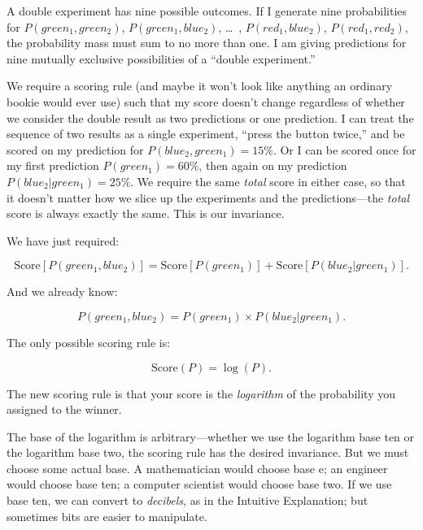 {
 A double experiment has nine possible outcomes. If I generate nine
probabilities for $P(green_{1}, green_{2})$,
$P(green_{1}, blue_{2})$, \ldots~,
$P(red_{1}, blue_{2})$, $P(red_{1},
red_{2})$, the probability mass must sum to no more than
one. I am giving predictions for nine mutually exclusive possibilities
of a ``double experiment.''}

{
 We require a scoring rule (and maybe it won't look
like anything an ordinary bookie would ever use) such that my score
doesn't change regardless of whether we consider the
double result as two predictions or one prediction. I can treat the
sequence of two results as a single experiment,
``press the button twice,'' and be
scored on my prediction for $P(blue_{2},
green_{1}) = 15\%$. Or I can be scored once for my first
prediction $P(green_{1}) = 60\%$, then again on my
prediction $P(blue_{2}|green_{1}) =
25\%$. We require the same \textit{total} score in either case, so that
it doesn't matter how we slice up the experiments and
the predictions---the \textit{total} score is always exactly the same.
This is our invariance.}

{
 We have just required:}

\begin{equation*}
 \text{Score}[P(green_{1},blue_{2})] = \text{Score}[P(green_{1})] + \text{Score}[P(blue_{2}|green_{1})].
\end{equation*}

{
 And we already know:}

\begin{equation*}
 P(green_{1},blue_{2}) = P(green_{1}) \times P(blue_{2}|green_{1}).
\end{equation*}

{
 The only possible scoring rule is:}

\begin{equation*}
 \text{Score}(P) = \log(P).
\end{equation*}

{
 The new scoring rule is that your score is the \textit{logarithm}
of the probability you assigned to the winner.}

{
 The base of the logarithm is arbitrary---whether we use the
logarithm base ten or the logarithm base two, the scoring rule has the
desired invariance. But we must choose some actual base. A
mathematician would choose base e; an engineer would choose base ten; a
computer scientist would choose base two. If we use base ten, we can
convert to \textit{decibels}, as in the Intuitive Explanation; but
sometimes bits are easier to manipulate.}

